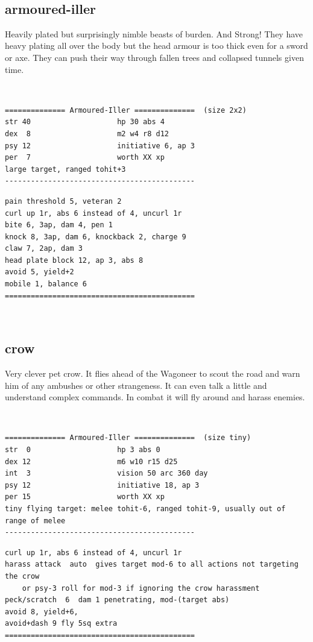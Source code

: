 \

\goodbreak 
\subsection*{armoured-iller}

Heavily plated but surprisingly nimble beasts of burden. And Strong! They have heavy plating all over the body but the head armour is too thick even for a sword or axe. They can push their way through fallen trees and collapsed tunnels given time.

\

\small \begin{samepage} \begin{verbatim}
============== Armoured-Iller ==============  (size 2x2)
str 40                    hp 30 abs 4
dex  8                    m2 w4 r8 d12
psy 12                    initiative 6, ap 3
per  7                    worth XX xp
large target, ranged tohit+3
--------------------------------------------
\end{verbatim} \goodbreak \begin{verbatim}
pain threshold 5, veteran 2
curl up 1r, abs 6 instead of 4, uncurl 1r
bite 6, 3ap, dam 4, pen 1
knock 8, 3ap, dam 6, knockback 2, charge 9
claw 7, 2ap, dam 3
head plate block 12, ap 3, abs 8
avoid 5, yield+2
mobile 1, balance 6
============================================
\end{verbatim} \end{samepage} \normalsize

\


\goodbreak 
\subsection*{crow}

Very clever pet crow. It flies ahead of the Wagoneer to scout the road and warn him of any ambushes or other strangeness. It can even talk a little and understand complex commands. In combat it will fly around and harass enemies.

\

\small \begin{samepage} \begin{verbatim}
============== Armoured-Iller ==============  (size tiny)
str  0                    hp 3 abs 0
dex 12                    m6 w10 r15 d25
int  3                    vision 50 arc 360 day
psy 12                    initiative 18, ap 3
per 15                    worth XX xp
tiny flying target: melee tohit-6, ranged tohit-9, usually out of range of melee
--------------------------------------------
\end{verbatim} \goodbreak \begin{verbatim}
curl up 1r, abs 6 instead of 4, uncurl 1r
harass attack  auto  gives target mod-6 to all actions not targeting the crow
    or psy-3 roll for mod-3 if ignoring the crow harassment
peck/scratch  6  dam 1 penetrating, mod-(target abs)
avoid 8, yield+6, 
avoid+dash 9 fly 5sq extra
============================================
\end{verbatim} \end{samepage} \normalsize

